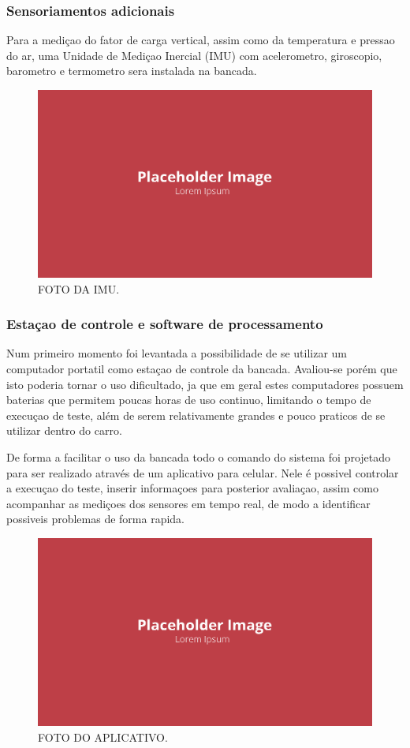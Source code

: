 \subsubsection{Sensoriamentos adicionais}

Para a mediçao do fator de carga vertical, assim como da temperatura e pressao do ar, uma Unidade de Mediçao Inercial (IMU) com acelerometro, giroscopio, barometro e termometro sera instalada na bancada.

\begin{figure}[!ht]
    \centering
    \includegraphics[width=.8\linewidth]{figuras/placeholder.png}
    \caption{FOTO DA IMU\cite{autor}.}
    \label{fig:placeholder}
\end{figure}

\subsubsection{Estaçao de controle e software de processamento}

Num primeiro momento foi levantada a possibilidade de se utilizar um computador portatil como estaçao de controle da bancada. Avaliou-se porém que isto poderia tornar o uso dificultado, ja que em geral estes computadores possuem baterias que permitem poucas horas de uso continuo, limitando o tempo de execuçao de teste, além de serem relativamente grandes e pouco praticos de se utilizar dentro do carro.

De forma a facilitar o uso da bancada todo o comando do sistema foi projetado para ser realizado através de um aplicativo para celular. Nele é possivel controlar a execuçao do teste, inserir informaçoes para posterior avaliaçao, assim como acompanhar as mediçoes dos sensores em tempo real, de modo a identificar possiveis problemas de forma rapida.

\begin{figure}[!ht]
    \centering
    \includegraphics[width=.8\linewidth]{figuras/placeholder.png}
    \caption{FOTO DO APLICATIVO\cite{autor}.}
    \label{fig:placeholder}
\end{figure}

